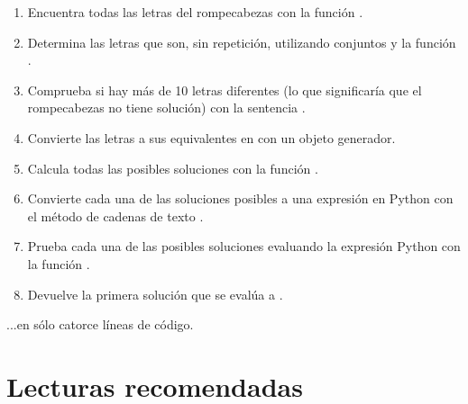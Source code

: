 \begin{enumerate}

\item Encuentra todas las letras del rompecabezas con la función .

\item Determina las letras que son, sin repetición, utilizando conjuntos y la función .

\item Comprueba si hay más de 10 letras diferentes (lo que significaría que el rompecabezas no tiene solución) con la sentencia .

\item Convierte las letras a sus equivalentes en  con un objeto generador.

\item Calcula todas las posibles soluciones con la función .

\item Convierte cada una de las soluciones posibles a una expresión en Python con el método de cadenas de texto .

\item Prueba cada una de las posibles soluciones evaluando la expresión Python con la función .

\item Devuelve la primera solución que se evalúa a .

\end{enumerate}

...en sólo catorce líneas de código.

\section{Lecturas recomendadas}

